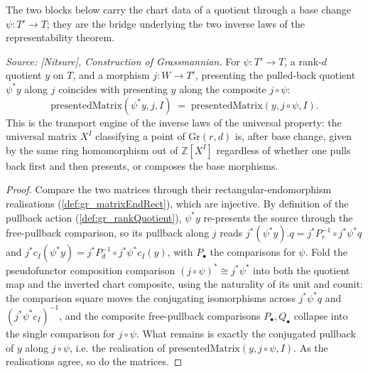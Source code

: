 The two blocks below carry the chart data of a quotient through a base change
\(\psi : T' \to T\); they are the bridge underlying the two inverse laws of the
representability theorem.

\begin{lemma}\leanok
  \label{lem:gr_presentedMatrix_rqPullback}
  \textit{Source: [Nitsure], Construction of Grassmannian.}
  For \(\psi : T' \to T\), a rank-\(d\) quotient \(y\) on \(T\), and a morphism
  \(j : W \to T'\), presenting the pulled-back quotient \(\psi^{*}y\) along \(j\) coincides
  with presenting \(y\) along the composite \(j\circ\psi\):
  \[
    \mathrm{presentedMatrix}(\psi^{*}y, j, I)
      \;=\; \mathrm{presentedMatrix}(y, j\circ\psi, I).
  \]
  This is the transport engine of the inverse laws of the universal property: the universal
  matrix \(X^I\) classifying a point of \(\mathrm{Gr}(r,d)\) is, after base change, given by
  the same ring homomorphism out of \(\mathbb{Z}[X^I]\) regardless of whether one pulls back
  first and then presents, or composes the base morphisms.
\end{lemma}
\begin{proof}
  Compare the two matrices through their rectangular-endomorphism realisations
  (\cref{def:gr_matrixEndRect}), which are injective. By definition of the pullback action
  (\cref{def:gr_rankQuotient}), \(\psi^{*}y\) re-presents the source through the free-pullback
  comparison, so its pullback along \(j\) reads \(j^{*}(\psi^{*}y).q = j^{*}P_r^{-1}\circ
  j^{*}\psi^{*}q\) and \(j^{*}c_I(\psi^{*}y) = j^{*}P_d^{-1}\circ j^{*}\psi^{*}c_I(y)\), with
  \(P_\bullet\) the comparisons for \(\psi\). Fold the pseudofunctor composition comparison
  \((j\circ\psi)^{*}\cong j^{*}\psi^{*}\) into both the quotient map and the inverted chart
  composite, using the naturality of its unit and counit: the comparison square moves the
  conjugating isomorphisms across \(j^{*}\psi^{*}q\) and \((j^{*}\psi^{*}c_I)^{-1}\), and the
  composite free-pullback comparisons \(P_\bullet, Q_\bullet\) collapse into the single
  comparison for \(j\circ\psi\). What remains is exactly the conjugated pullback of \(y\)
  along \(j\circ\psi\), i.e. the realisation of \(\mathrm{presentedMatrix}(y, j\circ\psi, I)\).
  As the realisations agree, so do the matrices.
\end{proof}

